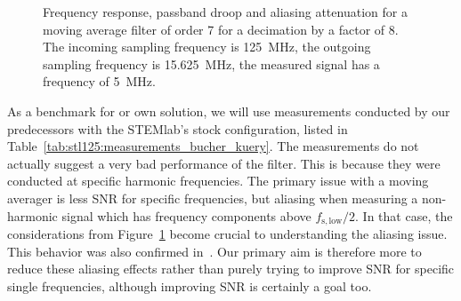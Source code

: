 \begin{figure}
    \centering
    
    \caption[Frequency Response of Moving Averager: Example]{%
        Frequency  response, passband  droop  and aliasing  attenuation for  a
        moving  average  filter  of  order  \num{7}  for  a  decimation  by  a
        factor of \num{8}. The incoming  sampling frequency is \SI{125}{\MHz},
        the  outgoing sampling  frequency is  \SI{15.625}{\MHz}, the  measured
        signal  has   a  frequency   of  \SI{5}{MHz}.%
    }
    \label{fig:stl125:moving_averager}
\end{figure}

As  a benchmark  for  or  own solution,  we  will  use measurements  conducted
by  our  predecessors  with  the  STEMlab's  stock  configuration,  listed  in
Table~\ref{tab:stl125:measurements_bucher_kuery}. The   measurements  do   not
actually  suggest  a very  bad  performance  of  the filter. This  is  because
they   were   conducted   at  specific   harmonic   frequencies. The   primary
issue  with  a   moving  averager  is  less  SNR   for  specific  frequencies,
but  aliasing  when  measuring  a  non-harmonic  signal  which  has  frequency
components above  $f_\mathrm{s,low}/2$. In that case, the  considerations from
Figure~\ref{fig:stl125:moving_averager}  become crucial  to understanding  the
aliasing issue.  This behavior was also confirmed in~\cite{bucher:kuery}.  Our
primary aim  is therefore more  to reduce  these aliasing effects  rather than
purely  trying  to  improve  SNR for  specific  single  frequencies,  although
improving SNR is certainly a goal too.

\begin{table}
    \centering
    \caption[Measurements of STEMlab 125-14 Stock Configuration]{%
        Measurement results  for STEMlab  125-14 from~\cite{bucher:kuery}. SNR
        was  determined for  a  specific harmonic  frequency  signal for  each
        sampling rate.%
    }
    \label{tab:stl125:measurements_bucher_kuery}
\end{table}

